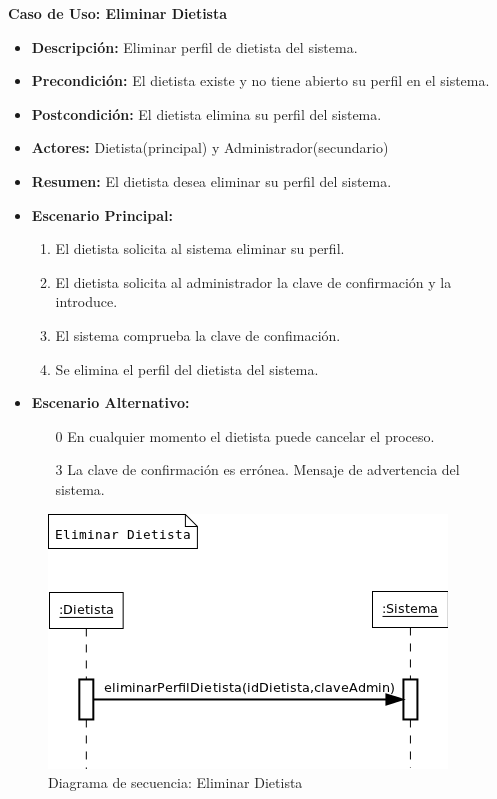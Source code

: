 \textbf{Caso de Uso: Eliminar Dietista}
\begin{itemize}
\item \textbf{Descripción:} Eliminar perfil de dietista del sistema.
\item \textbf{Precondición:} El dietista existe y no tiene abierto su perfil en el sistema.
\item \textbf{Postcondición:} El dietista elimina su perfil del sistema.
\item \textbf{Actores:} Dietista(principal) y Administrador(secundario)
\item \textbf{Resumen:} El dietista desea eliminar su perfil del sistema.
\item \textbf{Escenario Principal:}
\begin{enumerate}
\item El dietista solicita al sistema eliminar su perfil.
\item El dietista solicita al administrador la clave de confirmación y la introduce.
\item El sistema comprueba la clave de confimación.
\item Se elimina el perfil del dietista del sistema.
\end{enumerate}
\item \textbf{Escenario Alternativo:}
\begin{enumerate}
\item[0] En cualquier momento el dietista puede cancelar el proceso.
\item[3] La clave de confirmación es errónea. Mensaje de advertencia del sistema.
\end{enumerate}
\end{itemize}
\begin{figure}[H]
  \label{ds_eliminardietista}
  \begin{center}
    \includegraphics[scale=0.7]{../img/DS_EliminarDietista.png}
  \end{center}
  \caption{Diagrama de secuencia: Eliminar Dietista}
\end{figure}
